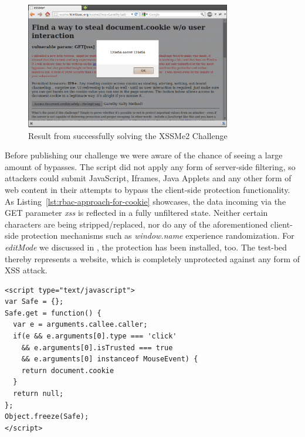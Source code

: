 \begin{figure}[htb]
\centering
\includegraphics[width=0.8\textwidth]{./img/xss-me-figure.png}
\caption{Result from successfully solving the XSSMe2 Challenge}
\label{fig:xss-me-result}
\end{figure}

      Before publishing our challenge we were aware of the chance of seeing a large amount of bypasses. The script did not apply any form of server-side filtering, so attackers could submit JavaScript, Iframes, Java Applets and any other form of web content in their attempts to bypass the client-side protection functionality. As Listing~\ref{lst:rbac-approach-for-cookie} showcases, the data incoming via the GET parameter \textit{xss} is reflected in a fully unfiltered state. Neither certain characters are being stripped/replaced, nor do any of the aforementioned client-side protection mechanisms such as \textit{window.name} experience randomization. For \textit{editMode} we discussed in \cite{heiderich2011voteid}, the protection has been installed, too. The test-bed thereby represents a website, which is completely unprotected against any form of XSS attack.\\

\begin{lstlisting}[captionpos=b,label=lst:rbac-safe-method,caption=Proposal for a safe getter with caller verification]
<script type="text/javascript">
var Safe = {};
Safe.get = function() {
  var e = arguments.callee.caller;
  if(e && e.arguments[0].type === 'click'
    && e.arguments[0].isTrusted === true
    && e.arguments[0] instanceof MouseEvent) {
    return document.cookie
  }
  return null;
};
Object.freeze(Safe);
</script>
\end{lstlisting}

